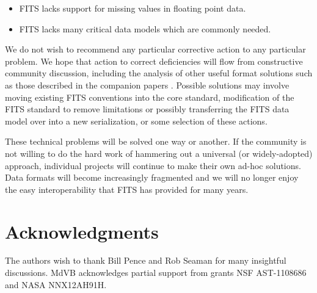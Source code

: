 \documentclass[final,authoryear,5p,times,twocolumn]{elsarticle}
\begin{document}
{{\begin{itemize}
\item FITS lacks support for missing values in floating point data.

\item FITS lacks many critical data models which are commonly needed.

\end{itemize}


We do not wish to recommend any particular corrective action to any
particular problem. We hope that action to correct deficiencies will
flow from constructive community discussion, including the analysis of
other useful format solutions such as those described in the companion
papers \citep{2014Kitaeff,2014Jenness}.
Possible solutions may involve moving existing FITS
conventions into the core standard, modification of the FITS standard to
remove limitations or possibly transferring the FITS data model over
into a new serialization, or some selection of these actions.


These technical problems will be solved one way or another. If the
community is not willing to do the hard work of hammering out a
universal (or widely-adopted) approach, individual projects will
continue to make their own ad-hoc solutions. Data formats will become
increasingly fragmented and we will no longer enjoy the easy
interoperability that FITS has provided for many years.



\section{Acknowledgments}


The authors wish to thank Bill Pence and Rob Seaman for many insightful
discussions.
MdVB acknowledges partial support from grants NSF AST-1108686 and NASA
NNX12AH91H.




}}
\end{document}
